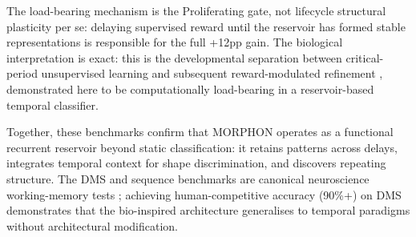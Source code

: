 The load-bearing mechanism is the Proliferating gate, not lifecycle structural plasticity per se: delaying supervised reward until the reservoir has formed stable representations is responsible for the full +12pp gain. The biological interpretation is exact: this is the developmental separation between critical-period unsupervised learning and subsequent reward-modulated refinement \cite{hensch2005critical}, demonstrated here to be computationally load-bearing in a reservoir-based temporal classifier.

Together, these benchmarks confirm that MORPHON operates as a functional recurrent reservoir beyond static classification: it retains patterns across delays, integrates temporal context for shape discrimination, and discovers repeating structure. The DMS and sequence benchmarks are canonical neuroscience working-memory tests \cite{compte2000synaptic,baddeley2003working}; achieving human-competitive accuracy (90\%+) on DMS demonstrates that the bio-inspired architecture generalises to temporal paradigms without architectural modification.

